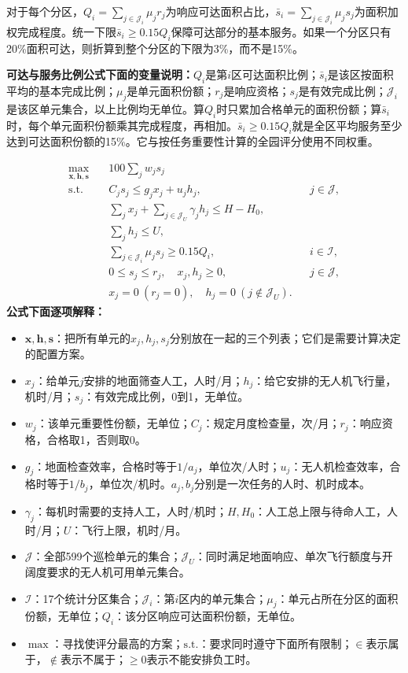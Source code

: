 \documentclass[12pt,a4paper]{article}
\numberwithin{equation}{section}
\begin{document}
对于每个分区，$Q_i=\sum_{j\in\mathcal J_i}\mu_jr_j$为响应可达面积占比，$\bar s_i=\sum_{j\in\mathcal J_i}\mu_js_j$为面积加权完成程度。统一下限$\bar s_i\ge0.15Q_i$保障可达部分的基本服务。如果一个分区只有20\%面积可达，则折算到整个分区的下限为3\%，而不是15\%。

\noindent\textbf{可达与服务比例公式下面的变量说明：}$Q_i$是第$i$区可达面积比例；$\bar s_i$是该区按面积平均的基本完成比例；$\mu_j$是单元面积份额；$r_j$是响应资格；$s_j$是有效完成比例；$\mathcal J_i$是该区单元集合，以上比例均无单位。算$Q_i$时只累加合格单元的面积份额；算$\bar s_i$时，每个单元面积份额乘其完成程度，再相加。$\bar s_i\ge0.15Q_i$就是全区平均服务至少达到可达面积份额的15\%。它与按任务重要性计算的全园评分使用不同权重。


\begin{equation}
\boxed{\begin{aligned}
\max_{\mathbf x,\mathbf h,\mathbf s}\quad&100\sum_jw_js_j\\
\mathrm{s.t.}\quad&C_js_j\le g_jx_j+u_jh_j,&&j\in\mathcal J,\\
&\sum_jx_j+\sum_{j\in\mathcal J_U}\gamma_jh_j\le H-H_0,\\
&\sum_jh_j\le U,\\
&\sum_{j\in\mathcal J_i}\mu_js_j\ge0.15Q_i,&&i\in\mathcal I,\\
&0\le s_j\le r_j,\quad x_j,h_j\ge0,&&j\in\mathcal J,\\
&x_j=0\ (r_j=0),\quad h_j=0\ (j\notin\mathcal J_U).
\end{aligned}}
\label{eq:allocation}
\end{equation}
\noindent\textbf{公式下面逐项解释：}
\begin{itemize}
\item $\mathbf x,\mathbf h,\mathbf s$：把所有单元的$x_j,h_j,s_j$分别放在一起的三个列表；它们是需要计算决定的配置方案。
\item $x_j$：给单元$j$安排的地面筛查人工，人时/月；$h_j$：给它安排的无人机飞行量，机时/月；$s_j$：有效完成比例，0到1，无单位。
\item $w_j$：该单元重要性份额，无单位；$C_j$：规定月度检查量，次/月；$r_j$：响应资格，合格取1，否则取0。
\item $g_j$：地面检查效率，合格时等于$1/a_j$，单位次/人时；$u_j$：无人机检查效率，合格时等于$1/b_j$，单位次/机时。$a_j,b_j$分别是一次任务的人时、机时成本。
\item $\gamma_j$：每机时需要的支持人工，人时/机时；$H,H_0$：人工总上限与待命人工，人时/月；$U$：飞行上限，机时/月。
\item $\mathcal J$：全部599个巡检单元的集合；$\mathcal J_U$：同时满足地面响应、单次飞行额度与开阔度要求的无人机可用单元集合。
\item $\mathcal I$：17个统计分区集合；$\mathcal J_i$：第$i$区内的单元集合；$\mu_j$：单元占所在分区的面积份额，无单位；$Q_i$：该分区响应可达面积份额，无单位。
\item $\max$：寻找使评分最高的方案；$\mathrm{s.t.}$：要求同时遵守下面所有限制；$\in$表示属于，$\notin$表示不属于；$\ge0$表示不能安排负工时。
\end{itemize}
\end{document}
